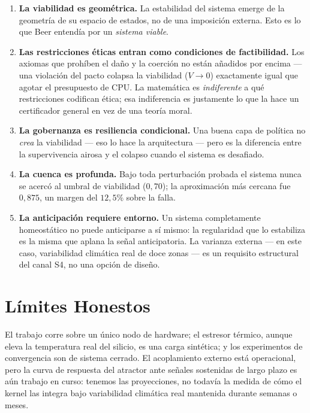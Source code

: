 \documentclass[11pt, a4paper]{article}
\begin{document}
\begin{enumerate}
  \item \textbf{La viabilidad es geométrica.} La estabilidad del sistema emerge de la
        geometría de su espacio de estados, no de una imposición externa. Esto es lo
        que Beer entendía por un \emph{sistema viable}.

  \item \textbf{Las restricciones éticas entran como condiciones de factibilidad.} Los
        axiomas que prohíben el daño y la coerción no están añadidos por encima --- una
        violación del pacto colapsa la viabilidad ($V \to 0$) exactamente igual que
        agotar el presupuesto de CPU. La matemática es \emph{indiferente} a qué
        restricciones codifican ética; esa indiferencia es justamente lo que la hace un
        certificador general en vez de una teoría moral.

  \item \textbf{La gobernanza es resiliencia condicional.} Una buena capa de política
        no \emph{crea} la viabilidad --- eso lo hace la arquitectura --- pero es la
        diferencia entre la supervivencia airosa y el colapso cuando el sistema es
        desafiado.

  \item \textbf{La cuenca es profunda.} Bajo toda perturbación probada el sistema nunca
        se acercó al umbral de viabilidad ($0{,}70$); la aproximación más cercana fue
        $0{,}875$, un margen del $12{,}5\%$ sobre la falla.

  \item \textbf{La anticipación requiere entorno.} Un sistema completamente homeostático
        no puede anticiparse a sí mismo: la regularidad que lo estabiliza es la misma
        que aplana la señal anticipatoria. La varianza externa --- en este caso,
        variabilidad climática real de doce zonas --- es un requisito estructural del
        canal S4, no una opción de diseño.
\end{enumerate}

\section*{Límites Honestos}

El trabajo corre sobre un único nodo de hardware; el estresor térmico, aunque eleva la
temperatura real del silicio, es una carga sintética; y los experimentos de convergencia
son de sistema cerrado. El acoplamiento externo está operacional, pero la curva de
respuesta del atractor ante señales sostenidas de largo plazo es aún trabajo en curso:
tenemos las proyecciones, no todavía la medida de cómo el kernel las integra bajo
variabilidad climática real mantenida durante semanas o meses.
\end{document}
